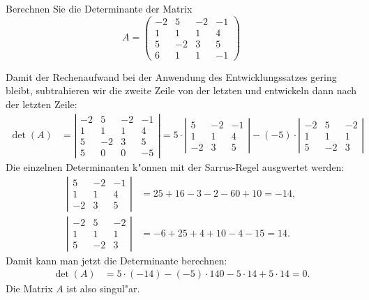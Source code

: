 Berechnen Sie die Determinante der Matrix
\[
A
=
\begin{pmatrix}
-2& 5&-2&-1\\
 1& 1& 1& 4\\
 5&-2& 3& 5\\
 6& 1& 1&-1
\end{pmatrix}
\]

\begin{loesung}
Damit der Rechenaufwand bei der Anwendung des Entwicklungssatzes gering bleibt, subtrahieren wir die zweite Zeile von der letzten und entwickeln dann
nach der letzten Zeile:
\begin{align*}
\det(A)
&=
\left|\begin{matrix}
-2& 5&-2&-1\\
 1& 1& 1& 4\\
 5&-2& 3& 5\\
 5& 0& 0&-5
\end{matrix}\right|
=
5\cdot
\left|\begin{matrix}
 5&-2&-1\\
 1& 1& 4\\
-2& 3& 5
\end{matrix}\right|
-(-5)\cdot
\left|\begin{matrix}
-2& 5&-2\\
 1& 1& 1\\
 5&-2& 3
\end{matrix}\right|
\end{align*}
Die einzelnen Determinanten k"onnen mit der Sarrus-Regel ausgwertet werden:
\begin{align*}
\left|\begin{matrix}
 5&-2&-1\\
 1& 1& 4\\
-2& 3& 5
\end{matrix}\right|
&=
25+16-3 -2-60+10
=
-14,
\\
\left|\begin{matrix}
-2& 5&-2\\
 1& 1& 1\\
 5&-2& 3
\end{matrix}\right|
&=
-6+25+4+10-4-15
=
14.
\end{align*}
Damit kann man jetzt die Determinante berechnen:
\begin{align*}
\det(A)
&=
5\cdot (-14)-(-5)\cdot 14
0
-5\cdot 14 + 5\cdot 14 =0.
\end{align*}
Die Matrix $A$ ist also singul"ar.
\end{loesung}

